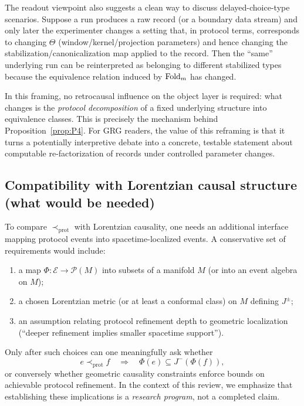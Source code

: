 The readout viewpoint also suggests a clean way to discuss delayed-choice-type scenarios. Suppose a run produces a raw record (or a boundary data stream) and only later the experimenter changes a setting that, in protocol terms, corresponds to changing $\Theta$ (window/kernel/projection parameters) and hence changing the stabilization/canonicalization map applied to the record. Then the ``same'' underlying run can be reinterpreted as belonging to different stabilized types because the equivalence relation induced by $\mathrm{Fold}_m$ has changed.

In this framing, no retrocausal influence on the object layer is required: what changes is the \emph{protocol decomposition} of a fixed underlying structure into equivalence classes. This is precisely the mechanism behind Proposition~\ref{prop:P4}. For GRG readers, the value of this reframing is that it turns a potentially interpretive debate into a concrete, testable statement about computable re-factorization of records under controlled parameter changes.

\subsection{Compatibility with Lorentzian causal structure (what would be needed)}\label{sec:causality:compatibility}

To compare $\prec_{\mathrm{prot}}$ with Lorentzian causality, one needs an additional interface mapping protocol events into spacetime-localized events. A conservative set of requirements would include:
\begin{enumerate}[label=(\roman*),leftmargin=*,itemsep=2pt]
  \item a map $\Phi:\mathcal{E}\to \mathcal{P}(M)$ into subsets of a manifold $M$ (or into an event algebra on $M$);
  \item a chosen Lorentzian metric (or at least a conformal class) on $M$ defining $J^\pm$;
  \item an assumption relating protocol refinement depth to geometric localization (``deeper refinement implies smaller spacetime support'').
\end{enumerate}

Only after such choices can one meaningfully ask whether
\[
e\prec_{\mathrm{prot}} f \quad\Rightarrow\quad \Phi(e)\subseteq J^-(\Phi(f)),
\]
or conversely whether geometric causality constraints enforce bounds on achievable protocol refinement. In the context of this review, we emphasize that establishing these implications is a \emph{research program}, not a completed claim.

